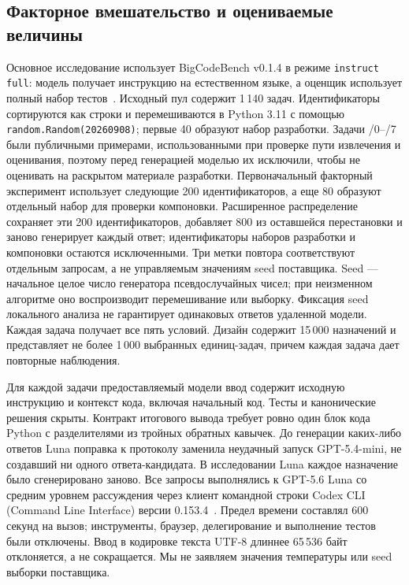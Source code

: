 \subsection{Факторное вмешательство и оцениваемые величины}
Основное исследование использует BigCodeBench v0.1.4 в режиме \texttt{instruct full}: модель получает инструкцию на естественном языке, а оценщик использует полный набор тестов~\cite{zhuo2024bigcodebench}. Исходный пул содержит 1\,140 задач. Идентификаторы сортируются как строки и перемешиваются в Python 3.11 с помощью \texttt{random.Random(20260908)}; первые 40 образуют набор разработки. Задачи /0--/7 были публичными примерами, использованными при проверке пути извлечения и оценивания, поэтому перед генерацией моделью их исключили, чтобы не оценивать на раскрытом материале разработки. Первоначальный факторный эксперимент использует следующие 200 идентификаторов, а еще 80 образуют отдельный набор для проверки компоновки. Расширенное распределение сохраняет эти 200 идентификаторов, добавляет 800 из оставшейся перестановки и заново генерирует каждый ответ; идентификаторы наборов разработки и компоновки остаются исключенными. Три метки повтора соответствуют отдельным запросам, а не управляемым значениям seed поставщика. Seed --- начальное целое число генератора псевдослучайных чисел; при неизменном алгоритме оно воспроизводит перемешивание или выборку. Фиксация seed локального анализа не гарантирует одинаковых ответов удаленной модели. Каждая задача получает все пять условий. Дизайн содержит 15\,000 назначений и представляет не более 1\,000 выбранных единиц-задач, причем каждая задача дает повторные наблюдения.

Для каждой задачи предоставляемый модели ввод содержит исходную инструкцию и контекст кода, включая начальный код. Тесты и канонические решения скрыты. Контракт итогового вывода требует ровно один блок кода Python с разделителями из тройных обратных кавычек. До генерации каких-либо ответов Luna поправка к протоколу заменила неудачный запуск GPT-5.4-mini, не создавший ни одного ответа-кандидата. В исследовании Luna каждое назначение было сгенерировано заново. Все запросы выполнялись к GPT-5.6 Luna со средним уровнем рассуждения через клиент командной строки Codex CLI (Command Line Interface) версии 0.153.4~\cite{openai56luna2026,codexexec2026}. Предел времени составлял 600 секунд на вызов; инструменты, браузер, делегирование и выполнение тестов были отключены. Ввод в кодировке текста UTF-8 длиннее 65\,536 байт отклоняется, а не сокращается. Мы не заявляем значения температуры или seed выборки поставщика.

